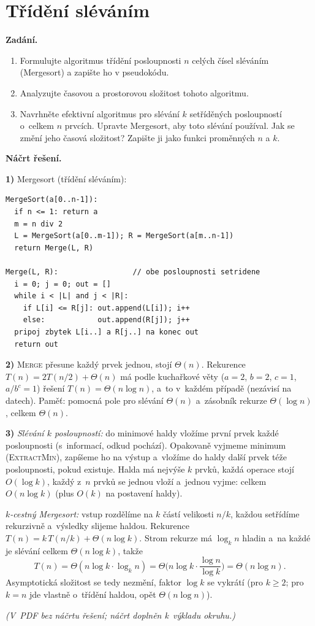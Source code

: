 \section{Třídění sléváním}

\noindent\textbf{Zadání.}\par
\begin{enumerate}
\item Formulujte algoritmus třídění posloupnosti $n$ celých čísel sléváním (Mergesort)
  a zapište ho v pseudokódu.
\item Analyzujte časovou a prostorovou složitost tohoto algoritmu.
\item Navrhněte efektivní algoritmus pro slévání $k$ setříděných posloupností o~celkem
  $n$ prvcích. Upravte Mergesort, aby toto slévání používal. Jak se změní jeho časová
  složitost? Zapište ji jako funkci proměnných $n$ a $k$.
\end{enumerate}

\medskip
\noindent\textbf{Náčrt řešení.}\par
\textbf{1)} Mergesort (třídění sléváním):
\begin{lstlisting}
MergeSort(a[0..n-1]):
  if n <= 1: return a
  m = n div 2
  L = MergeSort(a[0..m-1]); R = MergeSort(a[m..n-1])
  return Merge(L, R)

Merge(L, R):                 // obe posloupnosti setridene
  i = 0; j = 0; out = []
  while i < |L| and j < |R|:
    if L[i] <= R[j]: out.append(L[i]); i++
    else:            out.append(R[j]); j++
  pripoj zbytek L[i..] a R[j..] na konec out
  return out
\end{lstlisting}

\textbf{2)} \textsc{Merge} přesune každý prvek jednou, stojí $\Theta(n)$. Rekurence
$T(n)=2T(n/2)+\Theta(n)$ má podle kuchařkové věty ($a=2$, $b=2$, $c=1$, $a/b^c=1$)
řešení $T(n)=\Theta(n\log n)$, a~to v~každém případě (nezávisí na datech). Paměť:
pomocná pole pro slévání $\Theta(n)$ a~zásobník rekurze $\Theta(\log n)$, celkem
$\Theta(n)$.

\textbf{3)} \emph{Slévání $k$ posloupností:} do minimové haldy vložíme první prvek
každé posloupnosti (s~informací, odkud pochází). Opakovaně vyjmeme minimum
(\textsc{ExtractMin}), zapíšeme ho na výstup a~vložíme do haldy další prvek téže
posloupnosti, pokud existuje. Halda má nejvýše $k$ prvků, každá operace stojí
$O(\log k)$, každý z~$n$ prvků se jednou vloží a~jednou vyjme: celkem $O(n\log k)$
(plus $O(k)$ na postavení haldy).

\emph{$k$-cestný Mergesort:} vstup rozdělíme na $k$ částí velikosti $n/k$, každou
setřídíme rekurzivně a~výsledky slijeme haldou. Rekurence
$T(n)=k\,T(n/k)+\Theta(n\log k)$. Strom rekurze má $\log_k n$ hladin a~na každé je
slévání celkem $\Theta(n\log k)$, takže
\[
T(n)=\Theta(n\log k\cdot\log_k n)=\Theta\Big(n\log k\cdot\frac{\log n}{\log k}\Big)
=\Theta(n\log n).
\]
Asymptotická složitost se tedy nezmění, faktor $\log k$ se vykrátí (pro $k\ge2$; pro
$k=n$ jde vlastně o~třídění haldou, opět $\Theta(n\log n)$).

\medskip
\textit{(V~PDF bez náčrtu řešení; náčrt doplněn k~výkladu okruhu.)}
